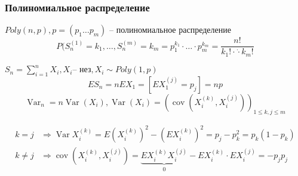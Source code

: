 \documentclass{article}
\DeclareMathOperator{\Var}{Var}
\DeclareMathOperator{\cov}{cov}
\begin{document}
    \subsubsection{Полиномиальное распределение}
    \begin{definition}
        $ Poly(n, p), p = (p_1 \dots p_m) $ -- полиномиальное распределение
        $$ P(S_n^{(1)}=k_1, \dots , S_n^{(m)}=k_m = p_1^{k_1} \cdot \dots \cdot p_m^{k_m} = \frac{n!}{k_1! \cdot \dot \cdot k_m!}$$
    \end{definition}
    \begin{example}
        $S_n = \sum\limits_{i=1}^{n} X_i,  X_i \text{-- нез}, X_i \sim Poly(1, p)$
        $$ ES_n = n EX_1 = [EX_1^{(j)} = p_j] =np $$
        $$ \Var _n = n \Var (X_i), \Var(X_i) = (\cov(X_i^{(k)}, X_i^{(j)}))_{1\le k, j\le m} $$
        
        \begin{align*}
         k = j &\Rightarrow \Var X_i^{(k)} = E(X_i^{(k)})^2 - (EX_i^{(k)})^2 = p_j - p_k^2= p_k(1-p_k)\\
        k \ne j &\Rightarrow \cov (X_i^{(k)}, X_i^{(j)}) = \underbrace{E X_i^{(k)} X_i^{(j)}}_0 - EX_i^{(k)}\cdot EX_i^{(j)} = -p_jp_j\\
        \end{align*}
    \end{example}
\end{document}
